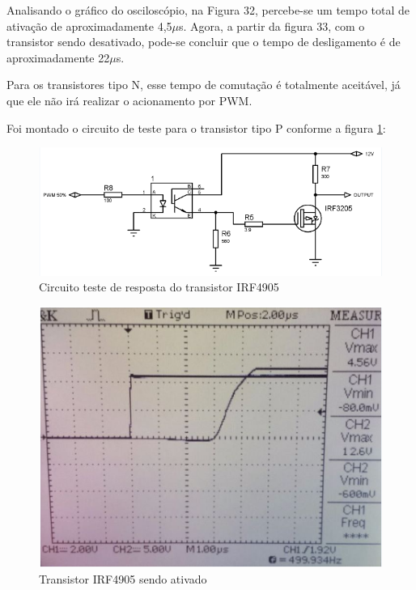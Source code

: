 	Analisando o gráfico do osciloscópio, na Figura 32, percebe-se um tempo total de ativação de aproximadamente 4,5$\mu$s. Agora, a partir da figura 33, com o transistor sendo desativado, pode-se concluir que o tempo de desligamento é de aproximadamente 22$\mu$s.
	
	Para os transistores tipo N, esse tempo de comutação é totalmente aceitável, já que ele não irá realizar o acionamento por PWM.
	
	Foi montado o circuito de teste para o transistor tipo P conforme a figura \ref{img:Circuito teste de resposta do transistor IRF4905}:
	\newpage
	
	\begin{figure}[!htp]
		\centering
		\includegraphics[scale=0.60]{circuito_teste_resposta_transistor.png}
		\caption{Circuito teste de resposta do transistor IRF4905}
		\label{img:Circuito teste de resposta do transistor IRF4905}
	\end{figure}
	
	\begin{figure}[!htp]
		\centering
		\includegraphics[scale=0.60]{transistor_sendo_ativado_3.png}
		\caption{Transistor IRF4905 sendo ativado}
		\label{img:Transistor IRF4905 sendo ativado}
	\end{figure}
	
